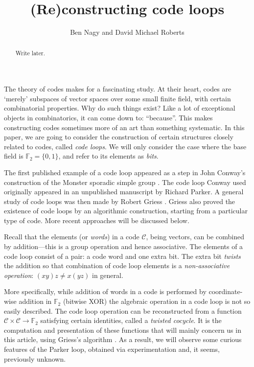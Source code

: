 \documentclass{article}
\theoremstyle{plain}
\theoremstyle{definition}
\def \cC {\mathcal{C}}
\def \FF {\mathbb{F}}
\begin{document}
\title{(Re)constructing code loops}
\author{Ben Nagy and David Michael Roberts}

\maketitle

\begin{abstract}
Write later.
\end{abstract}


\noindent
The theory of codes makes for a fascinating study. 
At their heart, codes are `merely' subspaces of vector spaces over some small finite field, with certain combinatorial properties.
Why do such things exist? Like a lot of exceptional objects in combinatorics, it can come down to: ``because''.
This makes constructing codes sometimes more of an art than something systematic.
In this paper, we are going to consider the construction of certain structures closely related to codes, called \emph{code loops}. 
We will only consider the case where the base field is $\FF_2=\{0,1\}$, and refer to its elements as \emph{bits}.

The first published example of a code loop appeared as a step in John Conway's construction of the Monster sporadic simple group \cite{Conway}. 
The code loop Conway used originally appeared in an unpublished manuscript by Richard Parker.
A general study of code loops was then made by Robert Griess \cite{Griess}.
Griess also proved the existence of code loops by an algorithmic construction, starting from a particular type of code.
More recent approaches will be discussed below.

Recall that the elements (or \emph{words}) in a code $\cC$, being vectors, can be combined by addition---this is a group operation and hence associative. 
The elements of a code loop consist of a pair: a code word and one extra bit.
The extra bit \emph{twists} the addition so that combination of code loop elements is a \emph{non-associative operation}: $(xy)z\not=x(yz)$ in general.

More specifically, while addition of words in a code is performed by coordinate-wise addition in $\FF_2$ (bitwise XOR) the algebraic operation in a code loop is not so easily described.
The code loop operation can be reconstructed from a function $\cC \times \cC \to \FF_2$ satisfying certain identities, called a \emph{twisted cocycle}.
It is the computation and presentation of these functions that will mainly concern us in this article, using Griess's algorithm \cite[proof of Theorem 10]{Griess}.
As a result, we will observe some curious features of the Parker loop, obtained via experimentation and, it seems, previously unknown.
\end{document}
